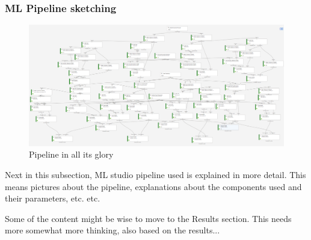 


\subsubsection*{ML Pipeline sketching}


\begin{figure}[htb]
    \centering
    \includegraphics[width=150mm]{./appendices/pipeline-draft}
    \caption{Pipeline in all its glory
    \label{fig:pipeline draft}}
\end{figure}







\begin{itcomment}
    Next in this subsection, ML studio pipeline used is explained in more detail.
    This means pictures about the pipeline,
    explanations about the components used and their parameters,
    etc. etc.

    Some of the content might be wise to move to the Results section.
    This needs more somewhat more thinking, also based on the results...
\end{itcomment}

